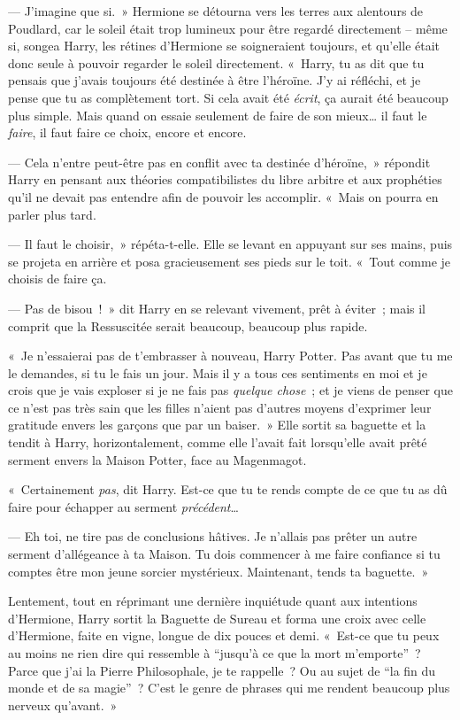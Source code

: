 --- J'imagine que si.~» Hermione se détourna vers les terres aux alentours de Poudlard, car le soleil était trop lumineux pour être regardé directement -- même si, songea Harry, les rétines d'Hermione se soigneraient toujours, et qu'elle était donc seule à pouvoir regarder le soleil directement. «~Harry, tu as dit que tu pensais que j'avais toujours été destinée à être l'héroïne. J'y ai réfléchi, et je pense que tu as complètement tort. Si cela avait été \emph{écrit}, ça aurait été beaucoup plus simple. Mais quand on essaie seulement de faire de son mieux… il faut le \emph{faire}, il faut faire ce choix, encore et encore.

--- Cela n'entre peut-être pas en conflit avec ta destinée d'héroïne,~» répondit Harry en pensant aux théories compatibilistes du libre arbitre et aux prophéties qu'il ne devait pas entendre afin de pouvoir les accomplir. «~Mais on pourra en parler plus tard.

--- Il faut le choisir,~» répéta-t-elle. Elle se levant en appuyant sur ses mains, puis se projeta en arrière et posa gracieusement ses pieds sur le toit. «~Tout comme je choisis de faire ça.

--- Pas de bisou~!~» dit Harry en se relevant vivement, prêt à éviter~; mais il comprit que la Ressuscitée serait beaucoup, beaucoup plus rapide.

«~Je n'essaierai pas de t'embrasser à nouveau, Harry Potter. Pas avant que tu me le demandes, si tu le fais un jour. Mais il y a tous ces sentiments en moi et je crois que je vais exploser si je ne fais pas \emph{quelque chose}~; et je viens de penser que ce n'est pas très sain que les filles n'aient pas d'autres moyens d'exprimer leur gratitude envers les garçons que par un baiser.~» Elle sortit sa baguette et la tendit à Harry, horizontalement, comme elle l'avait fait lorsqu'elle avait prêté serment envers la Maison Potter, face au Magenmagot.

«~Certainement \emph{pas}, dit Harry. Est-ce que tu te rends compte de ce que tu as dû faire pour échapper au serment \emph{précédent}…

--- Eh toi, ne tire pas de conclusions hâtives. Je n'allais pas prêter un autre serment d'allégeance à ta Maison. Tu dois commencer à me faire confiance si tu comptes être mon jeune sorcier mystérieux. Maintenant, tends ta baguette.~»

Lentement, tout en réprimant une dernière inquiétude quant aux intentions d'Hermione, Harry sortit la Baguette de Sureau et forma une croix avec celle d'Hermione, faite en vigne, longue de dix pouces et demi. «~Est-ce que tu peux au moins ne rien dire qui ressemble à “jusqu'à ce que la mort m'emporte”~? Parce que j'ai la Pierre Philosophale, je te rappelle~? Ou au sujet de “la fin du monde et de sa magie”~? C'est le genre de phrases qui me rendent beaucoup plus nerveux qu'avant.~»

